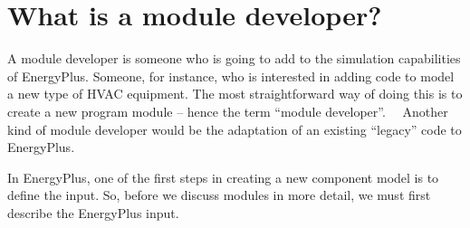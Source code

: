 \section{What is a module developer?}\label{what-is-a-module-developer}

A module developer is someone who is going to add to the simulation capabilities of EnergyPlus. Someone, for instance, who is interested in adding code to model a new type of HVAC equipment. The most straightforward way of doing this is to create a new program module -- hence the term ``module developer''.~~ Another kind of module developer would be the adaptation of an existing ``legacy'' code to EnergyPlus.

In EnergyPlus, one of the first steps in creating a new component model is to define the input. So, before we discuss modules in more detail, we must first describe the EnergyPlus input.

